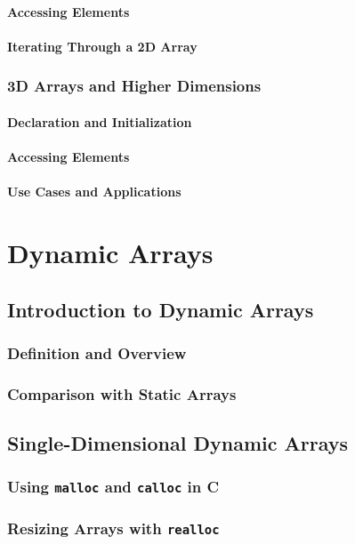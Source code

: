 \documentclass{book}
\begin{document}
	\subsubsection{Accessing Elements}
	\subsubsection{Iterating Through a 2D Array}
	\subsection{3D Arrays and Higher Dimensions}
	\subsubsection{Declaration and Initialization}
	\subsubsection{Accessing Elements}
	\subsubsection{Use Cases and Applications}
	
\chapter{Dynamic Arrays}
	\section{Introduction to Dynamic Arrays}
	\subsection{Definition and Overview}
	\subsection{Comparison with Static Arrays}
	
	\section{Single-Dimensional Dynamic Arrays}
	\subsection{Using \texttt{malloc} and \texttt{calloc} in C}
	\subsection{Resizing Arrays with \texttt{realloc}}
\end{document}
